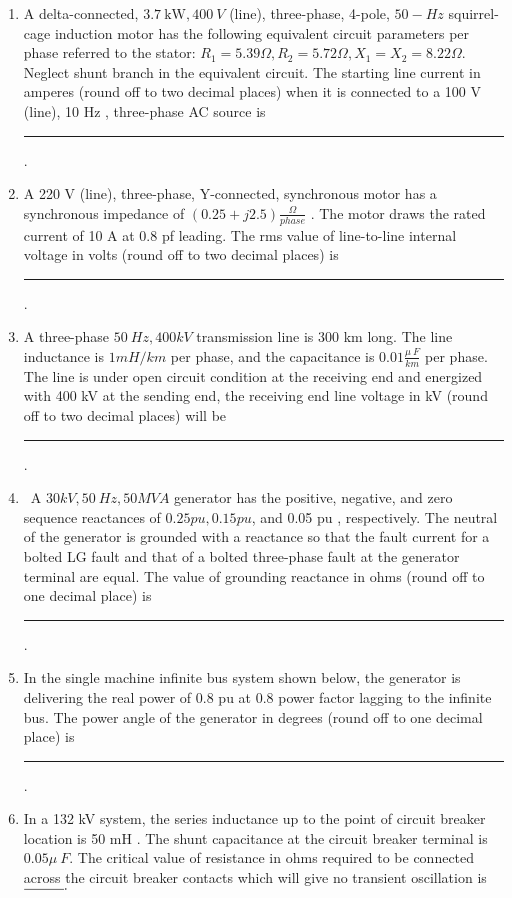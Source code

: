 \documentclass[journal]{IEEEtran}
\begin{document}
\begin{enumerate}
  
  \item A delta-connected, $3.7 \mathrm{~kW}, 400 {~V}$ (line), three-phase, 4-pole, $50-{Hz}$ squirrel-cage induction motor has the following equivalent circuit parameters per phase referred to the stator: $R_{1}=5.39 \Omega, R_{2}=5.72 \Omega, X_{1}=X_{2}=8.22 \Omega$. Neglect shunt branch in the equivalent circuit. The starting line current in amperes (round off to two decimal places) when it is connected to a 100 V (line), 10 Hz , three-phase AC source is \rule{1cm}{0.15mm} .
   \hfill{}
\item A 220 V (line), three-phase, Y-connected, synchronous motor has a synchronous impedance of $(0.25+j 2.5) \frac{\Omega}{phase} $ . The motor draws the rated current of 10 A at 0.8 pf leading. The rms value of line-to-line internal voltage in volts (round off to two decimal places) is
\rule{1cm}{0.15mm} .
\hfill{}
  \item  A three-phase $50 {~Hz}, 400 {kV}$ transmission line is 300 km long. The line inductance is $1 {mH} / {km}$ per phase, and the capacitance is $0.01 \frac{\mu {~F} }{ {km}}$ per phase. The line is under open circuit condition at the receiving end and energized with 400 kV at the sending end, the receiving end line voltage in kV (round off to two decimal places) will be \rule{1cm}{0.15mm} .
\hfill{}
  \item  {~A} $ 30 {kV}, 50 {~Hz}, 50 {MVA}$ generator has the positive, negative, and zero sequence reactances of $0.25 {pu}, 0.15 {pu}$, and 0.05 pu , respectively. The neutral of the generator is grounded with a reactance so that the fault current for a bolted LG fault and that of a bolted three-phase fault at the generator terminal are equal. The value of grounding reactance in ohms (round off to one decimal place) is \rule{1cm}{0.15mm} .
  \hfill{}
 \item In the single machine infinite bus system shown below, the generator is delivering the real power of 0.8 pu at 0.8 power factor lagging to the infinite bus. The power angle of the generator in degrees (round off to one decimal place) is  \rule{1cm}{0.15mm} . 
 
 \hfill{}
  
\item  In a 132 kV system, the series inductance up to the point of circuit breaker location is 50 mH . The shunt capacitance at the circuit breaker terminal is $0.05 \mu {~F}$. The critical value of resistance in ohms required to be connected across the circuit breaker contacts which will give no transient oscillation is $\rule{1cm}{0.15mm} . $ 
\hfill{}



\end{enumerate}
\end{document}
